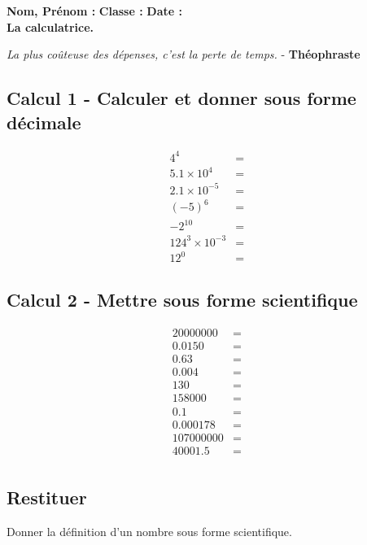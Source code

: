 \documentclass[10pt]{article}
\begin{document}

\textbf{Nom, Prénom :} \hspace{8cm} \textbf{Classe :} \hspace{3cm} \textbf{Date :}\\
\textbf{La calculatrice.}

\begin{center}
  \textit{La plus coûteuse des dépenses, c’est la perte de temps.}  - \textbf{Théophraste}
\end{center}

\subsection*{Calcul 1 - Calculer et donner sous forme décimale} 
\begin{eqnarray*}
	4^4                  &=& \\
	5.1 \times 10^4      &=& \\
	2.1 \times 10^{-5}   &=& \\
	(-5)^6               &=& \\
	-2^10                &=& \\
	124^3 \times 10^{-3} &=& \\
	12^0                 &=& 
\end{eqnarray*}
\subsection*{Calcul 2 - Mettre sous forme scientifique} 
\begin{eqnarray*}
	20 000 000  &=& \\
	0.0150      &=& \\
	0.63        &=& \\
	0.004       &=& \\
	130         &=& \\
	158 000     &=& \\
	0.1         &=& \\
	0.000 178   &=& \\
	107 000 000 &=& \\
	40 001.5    &=& \\
\end{eqnarray*}

\subsection*{Restituer}
Donner la définition d'un nombre sous forme scientifique. 
\end{document}
